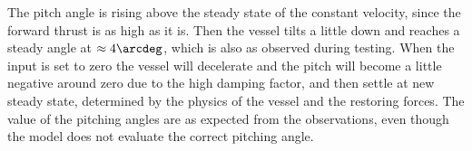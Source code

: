 The pitch angle is rising above the steady state of the constant velocity, since the forward thrust is as high as it is. Then the vessel tilts a little down and reaches a steady angle at $\approx 4\arcdeg$, which is also as observed during testing. When the input is set to zero the vessel will decelerate and the pitch will become a little negative around zero due to the high damping factor, and then settle at new steady state, determined by the physics of the vessel and the restoring forces. The value of the pitching angles are as expected from the observations, even though the model does not evaluate the correct pitching angle.